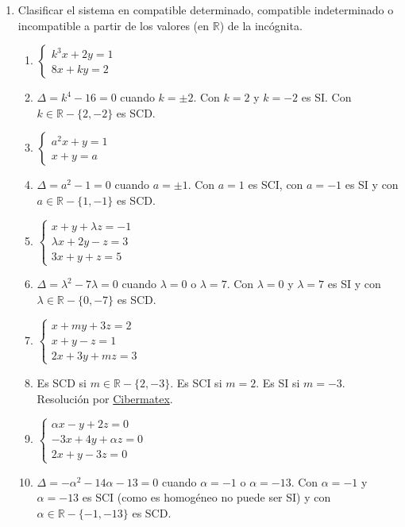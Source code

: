 \documentclass[a4paper]{article}
\newcommand{\answer}{\item[**]}
\newcommand{\exercise}{\item}
\begin{document}
\begin{enumerate}
\begin{multicols}{3}
\begin{enumerate} [label=(\alph*)]
	\end{enumerate}
	\end{multicols}

	\exercise Clasificar el sistema en compatible determinado, compatible indeterminado o incompatible a partir de los valores (en $\mathbb{R}$) de la incógnita.
	\begin{multicols}{3}
	\begin{enumerate} [label=(\alph*)]

		\item $\left\{\begin{matrix} k^3x+2y=1 \\ 8x+ky=2 \end{matrix}\right.$
		\answer $\Delta=k^4-16=0$ cuando $k=\pm 2$. Con $k=2$ y $k=-2$ es SI. Con $k\in\mathbb{R}-\{2,-2\}$ es SCD.

		\item $\left\{\begin{matrix} a^2x+y=1 \\ x+y=a \end{matrix}\right.$
		\answer $\Delta=a^2-1=0$ cuando $a=\pm 1$. Con $a=1$ es SCI, con $a=-1$ es SI y con $a\in\mathbb{R}-\{1,-1\}$ es SCD.

		\item $\left\{\begin{matrix} x+y+\lambda z=-1 \\ \lambda x+2y-z=3 \\ 3x+y+z=5 \end{matrix}\right.$
		\answer $\Delta=\lambda^2-7\lambda=0$ cuando $\lambda=0$ o $\lambda=7$. Con $\lambda=0$ y $\lambda=7$ es SI y con $\lambda\in\mathbb{R}-\{0,-7\}$ es SCD.

		\item $\left\{\begin{matrix} x+my+3z=2 \\ x+y-z=1 \\ 2x+3y+mz=3 \end{matrix}\right.$
		\answer Es SCD si $m\in \mathbb{R}-\{2,-3\}$. Es SCI si $m=2$. Es SI si $m=-3$. Resolución por \href{https://youtu.be/jKLkTVmpmSk}{Cibermatex}.

		\item $\left\{\begin{matrix} \alpha x-y+2z=0 \\ -3x+4y+\alpha z=0 \\ 2x+y-3z=0 \end{matrix}\right.$
		\answer $\Delta=-\alpha^2-14\alpha-13=0$ cuando $\alpha=-1$ o $\alpha=-13$. Con $\alpha=-1$ y $\alpha=-13$ es SCI (como es homogéneo no puede ser SI) y con $\alpha\in\mathbb{R}-\{-1,-13\}$ es SCD.


\end{enumerate}
\end{multicols}
\end{enumerate}
\end{document}

